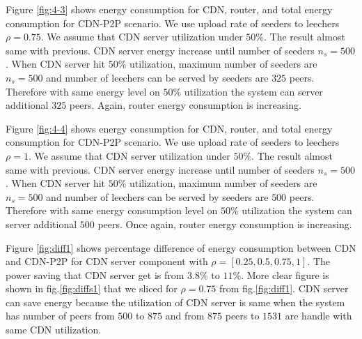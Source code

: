 \documentclass[JIP]{ipsj}
\begin{document}
Figure \ref{fig:4-3} shows energy consumption for CDN, router, and total energy consumption for CDN-P2P scenario.  
We use upload rate of seeders to leechers $\rho=0.75$.
We assume that CDN server utilization under $50\%$.
The result almost same with previous. 
CDN server energy increase until number of seeders $n_s=500$.
When CDN server hit $50\%$ utilization, maximum number of seeders are $n_s=500$ and number of leechers can be served by seeders are $325$ peers. 
Therefore with same energy level on $50\%$ utilization the system can server additional $325$ peers. 
Again, router energy consumption is increasing. 

Figure \ref{fig:4-4} shows energy consumption for CDN, router, and total energy consumption for CDN-P2P scenario.  
We use upload rate of seeders to leechers $\rho=1$.
We assume that CDN server utilization under $50\%$.
The result almost same with previous. 
CDN server energy increase until number of seeders $n_s=500$.
When CDN server hit $50\%$ utilization, maximum number of seeders are $n_s=500$ and number of leechers can be served by seeders are $500$ peers. 
Therefore with same energy consumption level on $50\%$ utilization the system can server additional $500$ peers. 
Once again, router energy consumption is increasing. 





Figure \ref{fig:diff1} shows percentage difference of energy consumption between CDN and CDN-P2P for CDN server component with $\rho=[0.25,0.5,0.75,1]$.
The power saving that CDN server get is from $3.8\%$ to $11\%$.
More clear figure is shown in fig.\ref{fig:diffs1} that we sliced for $\rho=0.75$ from fig.\ref{fig:diff1}. 
CDN server can save energy because the utilization of CDN server is same when the system has number of peers from $500$ to $875$ and from $875$ peers to $1531$ are handle with same CDN utilization.   
\end{document}

